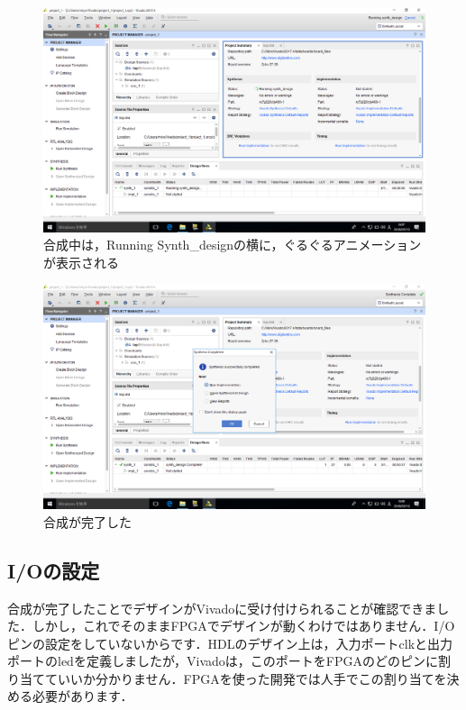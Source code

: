 \documentclass[a4paper,dvipdfmx]{jsarticle}
\begin{document}
 \begin{figure}[H]
  \begin{center}
   \includegraphics[width=.8\textwidth]{chapter03_figures/VirtualBox_Windows10_19_03_2018_00_07_16.png}
  \end{center}
  \caption{合成中は，Running Synth\_designの横に，ぐるぐるアニメーションが表示される}
 \end{figure}

 \begin{figure}[H]
  \begin{center}
   \includegraphics[width=.8\textwidth]{chapter03_figures/VirtualBox_Windows10_19_03_2018_00_08_08.png}
  \end{center}
  \caption{合成が完了した}
 \end{figure}

\subsection{I/Oの設定}
合成が完了したことでデザインがVivadoに受け付けられることが確認できました．しかし，これでそのままFPGAでデザインが動くわけではありません．I/Oピンの設定をしていないからです．HDLのデザイン上は，入力ポートclkと出力ポートのledを定義しましたが，Vivadoは，このポートをFPGAのどのピンに割り当てていいか分かりません．FPGAを使った開発では人手でこの割り当てを決める必要があります．
\end{document}
